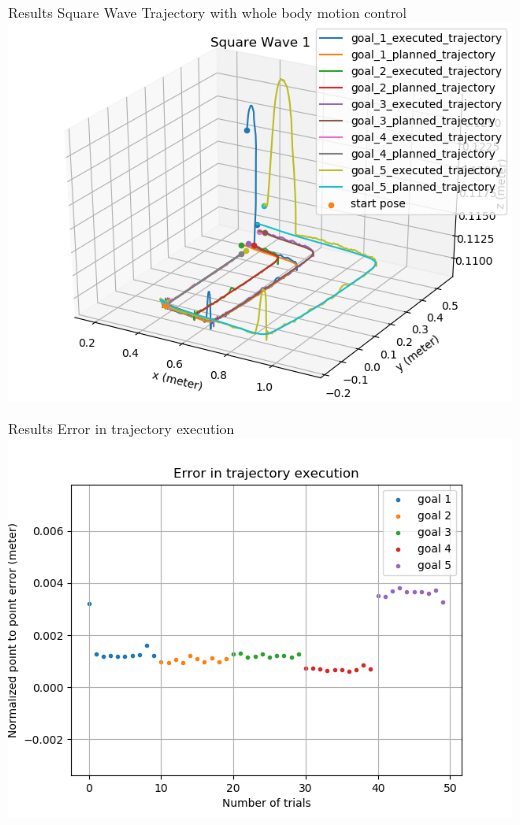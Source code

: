 \documentclass{beamer}
\begin{document}
	\begin{frame}{Results}
		\centering
		Square Wave Trajectory with whole body motion control
		\includegraphics[scale=0.4]{images/2/square.png}
	\end{frame}
	\begin{frame}{Results}
		\centering
		Error in trajectory execution
		\includegraphics[scale=0.4]{images/2/square_e.png}
	\end{frame}
	
\end{document}
